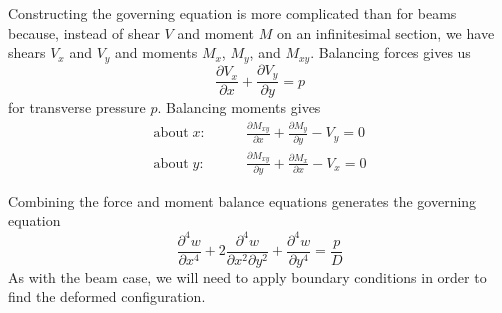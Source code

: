 Constructing the governing equation is more complicated than for beams because, instead of shear $V$ and moment $M$ on an infinitesimal section, we have shears $V_x$ and $V_y$ and moments $M_x$, $M_y$, and $M_{xy}$.
Balancing forces gives us
\begin{equation*}
\frac{\partial V_x}{\partial x}+\frac{\partial V_y}{\partial y} = p
\end{equation*}
for transverse pressure $p$.
Balancing moments gives
\begin{align*}
\text{about} \;x:\qquad& \frac{\partial M_{xy}}{\partial x}+\frac{\partial M_{y}}{\partial y} - V_y = 0\\
\text{about} \;y:\qquad& \frac{\partial M_{xy}}{\partial y}+\frac{\partial M_{x}}{\partial x} - V_x = 0
\end{align*}

Combining the force and moment balance equations generates the governing equation
\begin{equation*}
\frac{\partial^4w}{\partial x^4}+2\frac{\partial^4w}{\partial x^2 \partial y^2}+\frac{\partial^4w}{\partial y^4}=\frac{p}{D}
\end{equation*}
As with the beam case, we will need to apply boundary conditions in order to find the deformed configuration.
